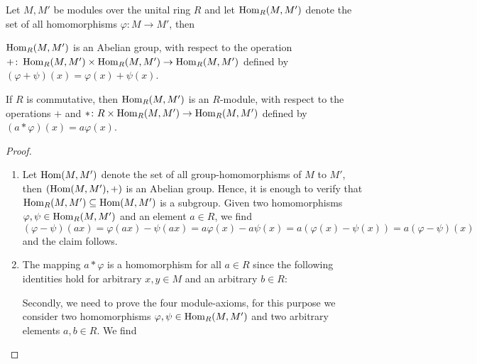 \begin{pro}\label{prop.Homomorphisms are Module}
Let $M,M'$ be modules over the unital ring $R$ and let $\operatorname{\mathrm{Hom}}_R(M,M')$ denote the set of all homomorphisms $\varphi\colon M\to M'$, then
\begin{exlist}
\item \label{prop.Homomorphisms are Group} $\operatorname{\mathrm{Hom}}_R(M,M')$ is an Abelian group, with respect to the operation $+\colon\operatorname{\mathrm{Hom}}_R(M,M')\times\operatorname{\mathrm{Hom}}_R(M,M')\to\operatorname{\mathrm{Hom}}_R(M,M')$ defined by $(\varphi+\psi)(x)=\varphi(x)+\psi(x)$.
\item If $R$ is commutative, then $\operatorname{\mathrm{Hom}}_R(M,M')$ is an $R$-module, with respect to the operations $+$ and $\ast\colon R\times\operatorname{\mathrm{Hom}}_R(M,M')\to\operatorname{\mathrm{Hom}}_R(M,M')$ defined by $(a\ast\varphi)(x)=a\varphi(x)$.
\end{exlist}
\end{pro}
\begin{proof}
\begin{enumerate}
\item Let $\operatorname{\mathrm{Hom}}(M,M')$ denote the set of all group-homomorphisms of $M$ to $M'$, then $(\operatorname{\mathrm{Hom}}(M,M'),+)$ is an Abelian group. Hence, it is enough to verify that $\operatorname{\mathrm{Hom}}_R(M,M')\subseteq\operatorname{\mathrm{Hom}}(M,M')$ is a subgroup. Given two homomorphisms $\varphi,\psi\in\operatorname{\mathrm{Hom}}_R(M,M')$ and an element $a\in R$, we find
\begin{equation*}
(\varphi-\psi)(ax)=\varphi(ax)-\psi(ax)=a\varphi(x)-a\psi(x)=a(\varphi(x)-\psi(x))=a(\varphi-\psi)(x)
\end{equation*}
and the claim follows.
\item The mapping $a\ast\varphi$ is a homomorphism for all $a\in R$ since the following identities hold for arbitrary $x,y\in M$ and an arbitrary $b\in R$:


Secondly, we need to prove the four module-axioms, for this purpose we consider two homomorphisms $\varphi,\psi\in\operatorname{\mathrm{Hom}}_R(M,M')$ and two arbitrary elements $a,b\in R$. We find
\end{enumerate}
\end{proof}

